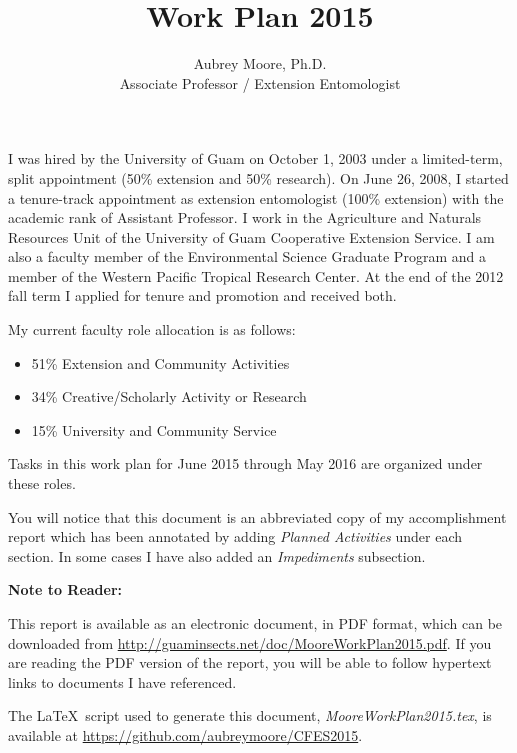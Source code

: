 \documentclass[12pt,oneside,english]{scrbook}
\begin{document}

\title{Work Plan 2015}
\author{Aubrey Moore, Ph.D.\\
Associate Professor / Extension Entomologist}
\maketitle

I was hired by the University of Guam on October 1, 2003 under a limited-term,
split appointment (50\% extension and 50\% research). On June 26,
2008, I started a tenure-track appointment as extension entomologist (100\% extension)
with the academic rank of Assistant Professor. I work in the Agriculture and Naturals Resources Unit of the University of Guam Cooperative Extension Service. I am also a faculty member
of the Environmental Science Graduate Program and a member of the
Western Pacific Tropical Research Center. At the end of the 2012 fall
term I applied for tenure and promotion and received both.

My current faculty role allocation is as follows:
\begin{itemize}
	\item 51\% Extension and Community Activities 
	\item 34\% Creative/Scholarly Activity or Research 
	\item 15\% University and Community Service
\end{itemize}

Tasks in this work plan for June 2015 through May 2016 are organized under these roles.

You will notice that this document is an abbreviated copy of my accomplishment report which has been annotated by adding \emph{Planned Activities} under each section. In some cases I have also added an \emph{Impediments} subsection.

\vfill
\textbf{Note to Reader:}

This report is available as an electronic document, in PDF format, which can
be downloaded from \url{http://guaminsects.net/doc/MooreWorkPlan2015.pdf}. If you are reading the PDF version of the report, you will be able to follow hypertext links to documents I have referenced. 

The \LaTeX\ script used to generate this document, \emph{MooreWorkPlan2015.tex},  
is available at \url{https://github.com/aubreymoore/CFES2015}.
\end{document}
